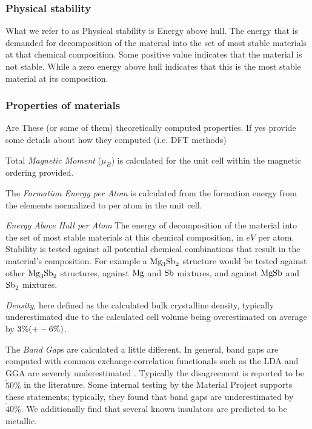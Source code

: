 	 


	\subsubsection*{Physical stability}
	What we refer to as Physical stability is Energy above hull. The energy that is demanded for decomposition of the material into the set of most stable materials at that chemical composition. Some positive value indicates that the material is not stable. While a zero energy above hull indicates that this is the most stable material at its composition. 
	
	\subsubsection{Properties of materials}
	Are These (or some of them) theoretically computed properties. If yes provide some details about how they computed (i.e. DFT methods)

Total \textit{Magnetic Moment} ($\si{\mu_B}$) is calculated for the unit cell within the magnetic ordering provided. 


The \textit{Formation Energy per Atom} is calculated from the formation energy from the elements normalized to per atom in the unit cell.

\textit{Energy Above Hull per Atom}
The energy of decomposition of the material into the set of most stable materials at this chemical composition, in $eV$ per atom. Stability is tested against all potential chemical combinations that result in the material's composition. For example a $\ce{Mg_3Sb_2}$ structure would be tested against other $\ce{Mg_3Sb_2}$ structures, against $\ce{Mg}$ and $\ce{Sb}$ mixtures, and against $\ce{MgSb}$ and $\ce{Sb_2}$ mixtures. 

\textit{Density}, here defined as the calculated bulk crystalline density, typically underestimated due to the calculated cell volume being overestimated on average by $3\% (+\/- 6\%)$.

The \textit{Band Gap}s are calculated a little different. In general, band gaps are computed with common exchange-correlation functionals such as the LDA \cite{perdew1983physical} and GGA are severely underestimated \cite{perdew1985density}. Typically the disagreement is reported to be $\tilde 50\%$ in the literature. Some internal testing by the Material Project supports these statements; typically, they found that band gaps are underestimated by $\tilde40\%$. We additionally find that several known insulators are predicted to be metallic. 
	
